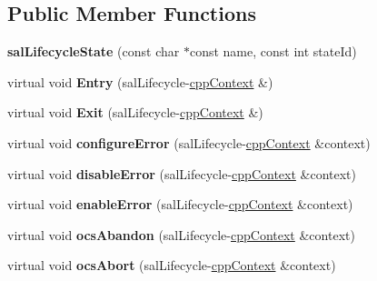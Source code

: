 \subsection*{Public Member Functions}
\begin{DoxyCompactItemize}
\item 
\hypertarget{classsal_lifecycle_state_a76491dca6083f5aeb34eca62e5d7f451}{{\bfseries sal\-Lifecycle\-State} (const char $\ast$const name, const int state\-Id)}\label{classsal_lifecycle_state_a76491dca6083f5aeb34eca62e5d7f451}

\item 
\hypertarget{classsal_lifecycle_state_a90adbd9a0b400c367c168fcb53e57917}{virtual void {\bfseries Entry} (sal\-Lifecycle-\/\hyperlink{classcpp_context}{cpp\-Context} \&)}\label{classsal_lifecycle_state_a90adbd9a0b400c367c168fcb53e57917}

\item 
\hypertarget{classsal_lifecycle_state_a7389a9959d0a925fc214e8fb9033ba12}{virtual void {\bfseries Exit} (sal\-Lifecycle-\/\hyperlink{classcpp_context}{cpp\-Context} \&)}\label{classsal_lifecycle_state_a7389a9959d0a925fc214e8fb9033ba12}

\item 
\hypertarget{classsal_lifecycle_state_a7771b7a868ec60a9818ea49afde0f68a}{virtual void {\bfseries configure\-Error} (sal\-Lifecycle-\/\hyperlink{classcpp_context}{cpp\-Context} \&context)}\label{classsal_lifecycle_state_a7771b7a868ec60a9818ea49afde0f68a}

\item 
\hypertarget{classsal_lifecycle_state_a6b669876e3f4b8d0cb6a1f4d749f613f}{virtual void {\bfseries disable\-Error} (sal\-Lifecycle-\/\hyperlink{classcpp_context}{cpp\-Context} \&context)}\label{classsal_lifecycle_state_a6b669876e3f4b8d0cb6a1f4d749f613f}

\item 
\hypertarget{classsal_lifecycle_state_a664bc49c7dc4e083f60873a99f1ad051}{virtual void {\bfseries enable\-Error} (sal\-Lifecycle-\/\hyperlink{classcpp_context}{cpp\-Context} \&context)}\label{classsal_lifecycle_state_a664bc49c7dc4e083f60873a99f1ad051}

\item 
\hypertarget{classsal_lifecycle_state_a8ae5cd42b3c9f6688ae2bab95d91968c}{virtual void {\bfseries ocs\-Abandon} (sal\-Lifecycle-\/\hyperlink{classcpp_context}{cpp\-Context} \&context)}\label{classsal_lifecycle_state_a8ae5cd42b3c9f6688ae2bab95d91968c}

\item 
\hypertarget{classsal_lifecycle_state_ab7b607557680cfaf74263a90f5be39d5}{virtual void {\bfseries ocs\-Abort} (sal\-Lifecycle-\/\hyperlink{classcpp_context}{cpp\-Context} \&context)}\label{classsal_lifecycle_state_ab7b607557680cfaf74263a90f5be39d5}


\end{DoxyCompactItemize}

